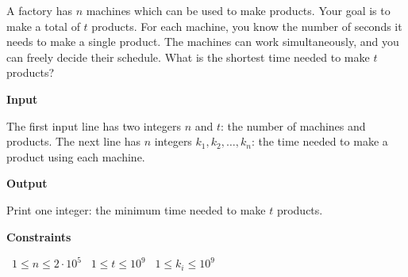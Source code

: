 A factory has $n$ machines which can be used to make products. Your goal is to make a total of $t$ products.
For each machine, you know the number of seconds it needs to make a single product. The machines can work simultaneously, and you can freely decide their schedule.
What is the shortest time needed to make $t$ products?

\vspace{0.3cm}\noindent\textbf{Input}

The first input line has two integers $n$ and $t$: the number of machines and products.
The next line has $n$ integers $k_1,k_2,\dots,k_n$: the time needed to make a product using each machine.

\vspace{0.3cm}\noindent\textbf{Output}

Print one integer: the minimum time needed to make $t$ products.

\vspace{0.3cm}\noindent\textbf{Constraints}

\textbullet\ $1 \le n \le 2 \cdot 10^5$
\textbullet\ $1 \le t \le 10^9$
\textbullet\ $1 \le k_i \le 10^9$